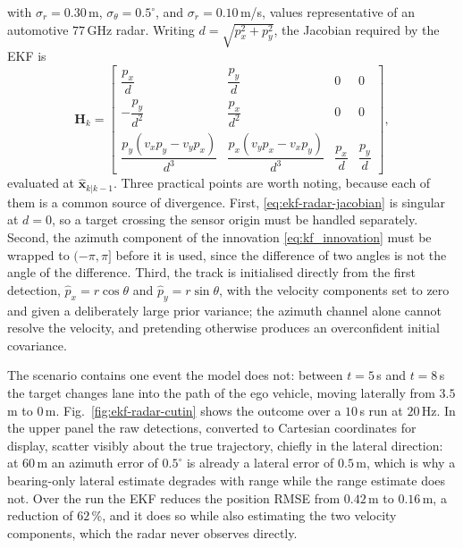 \begin{example}
\begin{equation}
\end{equation}
with $\sigma_r=0.30$\,m, $\sigma_\theta=0.5^{\circ}$, and
$\sigma_{\dot r}=0.10$\,m/s, values representative of an automotive
$77$\,GHz radar. Writing $d=\sqrt{p_x^{2}+p_y^{2}}$, the Jacobian required by
the EKF is
\begin{equation}
\mathbf{H}_k=
\begin{bmatrix}
\dfrac{p_x}{d} & \dfrac{p_y}{d} & 0 & 0\\[8pt]
-\dfrac{p_y}{d^{2}} & \dfrac{p_x}{d^{2}} & 0 & 0\\[8pt]
\dfrac{p_y(v_xp_y-v_yp_x)}{d^{3}} &
\dfrac{p_x(v_yp_x-v_xp_y)}{d^{3}} &
\dfrac{p_x}{d} & \dfrac{p_y}{d}
\end{bmatrix},
\label{eq:ekf-radar-jacobian}
\end{equation}
evaluated at $\widehat{\mathbf{x}}_{k|k-1}$. Three practical points are worth
noting, because each of them is a common source of divergence. First,
\eqref{eq:ekf-radar-jacobian} is singular at $d=0$, so a target crossing the
sensor origin must be handled separately. Second, the azimuth component of the
innovation \eqref{eq:kf_innovation} must be wrapped to $(-\pi,\pi]$ before it is
used, since the difference of two angles is not the angle of the difference.
Third, the track is initialised directly from the first detection,
$\widehat{p}_x=r\cos\theta$ and $\widehat{p}_y=r\sin\theta$, with the velocity
components set to zero and given a deliberately large prior variance; the
azimuth channel alone cannot resolve the velocity, and pretending otherwise
produces an overconfident initial covariance.

The scenario contains one event the model does not: between $t=5$\,s and
$t=8$\,s the target changes lane into the path of the ego vehicle, moving
laterally from $3.5$\,m to $0$\,m. Fig.~\ref{fig:ekf-radar-cutin} shows the
outcome over a $10$\,s run at $20$\,Hz. In the upper panel the raw detections,
converted to Cartesian coordinates for display, scatter visibly about the true
trajectory, chiefly in the lateral direction: at $60$\,m an azimuth error of
$0.5^{\circ}$ is already a lateral error of $0.5$\,m, which is why a bearing-only
lateral estimate degrades with range while the range estimate does not. Over the
run the EKF reduces the position RMSE from $0.42$\,m to $0.16$\,m, a reduction of
$62$\,\%, and it does so while also estimating the two velocity components, which
the radar never observes directly.


\end{example}
